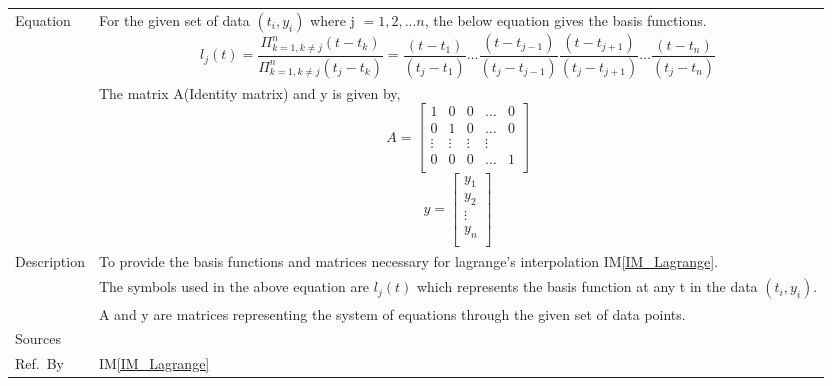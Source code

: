 \documentclass[12pt]{article}
\newcommand{\colAwidth}{0.13\textwidth}
\newcommand{\colBwidth}{0.82\textwidth}
\newcommand{\iref}[1]{IM\ref{#1}}
\begin{document}
\begin{minipage}{\textwidth}
\begin{tabular}{| p{\colAwidth} | p{\colBwidth}|}
		Equation
		&For the given set of data $(t_i, y_i)$ where j $= {1,2,...n}$, the below equation gives the basis functions.
		\begin{equation*}
		l_j (t) =  \frac{ \Pi _{k=1, k\neq j} ^n (t - t_k)} {\Pi _{k=1,k \neq j} ^ n (t_j - t_k)} = \frac{(t - t_1)}{(t_j - t_1)}...\frac{(t - t_{j-1})}{(t_j - t_{j-1})}\frac{(t - t_{j+1})}{(t_j - t_{j+1})}... \frac{(t - t_n)}{(t_j - t_n)}
		\end{equation*}
		\\
		&The matrix A(Identity matrix) and y is given by,
		\begin{equation*}
		A = \begin{bmatrix}
		1 & 0 & 0 & \dots & 0 \\
		0 & 1 & 0 & \dots & 0 \\
		\vdots & \vdots & \vdots & \vdots \\
		0 & 0 & 0 & \dots & 1 \\
		\end{bmatrix}
		\end{equation*}
		\begin{equation*}
		y = \begin{bmatrix}
		y_1  \\
		y_2 \\
		\vdots \\
		y_n \\
		\end{bmatrix}
		\end{equation*} \\
		\hline
Description 
&To provide the basis functions and matrices necessary for lagrange's interpolation \iref{IM_Lagrange}.\\
& The symbols used in the above equation are $l_j(t)$ which represents the basis function at any t in the data $(t_i, y_i)$.\\
&A and y are matrices representing the system of equations through the given set of data points.\\
\hline

Sources
& ~\cite{Health1997}\\
\hline

Ref.\ By 
& \iref{IM_Lagrange}\\
\hline

\end{tabular}
\end{minipage}\\

\end{document}
